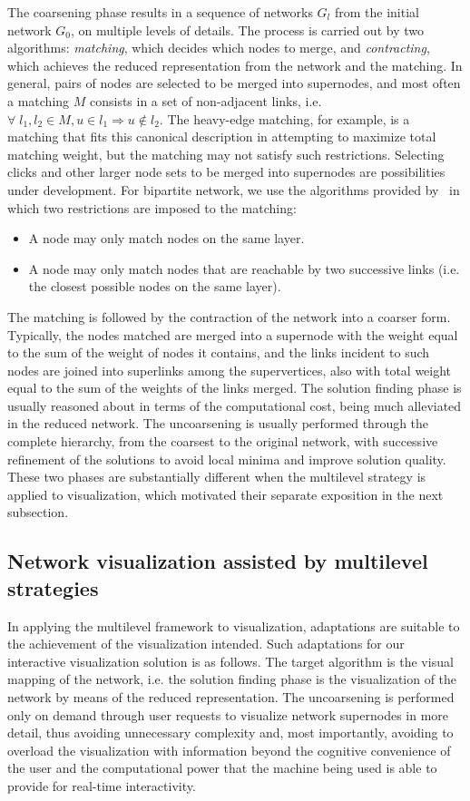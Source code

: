 \documentclass[runningheads]{llncs}
\begin{document}
The coarsening phase results in a sequence of networks $G_l$ from the initial network $G_0$,
on multiple levels of details.
The process is carried out by two algorithms: \emph{matching}, which decides which nodes to merge,
and \emph{contracting}, which achieves the reduced representation from the network and the matching.
In general, pairs of nodes are selected to be merged into supernodes, and
most often a matching $M$ consists in a set of non-adjacent links,
i.e. $\forall\; l_1, l_2 \in M, u \in l_1 \Rightarrow u \notin l_2$.
The heavy-edge matching, for example, is a matching that fits this canonical description
in attempting to maximize total matching weight, but the matching may not satisfy such restrictions.
Selecting clicks and other larger node sets to be merged into supernodes are possibilities
under development.
For bipartite network, we use the algorithms provided by~\cite{alan2} in which two restrictions
are imposed to the matching:
\begin{itemize}
  \item A node may only match nodes on the same layer.
  \item A node may only match nodes that are reachable by two successive links
    (i.e. the closest possible nodes on the same layer).
\end{itemize}

The matching is followed by the contraction of the network into a coarser form.
Typically, the nodes matched are merged into a supernode
with the weight equal to the sum of the weight of nodes it contains,
and the links incident to such nodes are joined into superlinks among the supervertices,
also with total weight equal to the sum of the weights of the links merged.
The solution finding phase is usually reasoned about in terms of the computational cost, being much
alleviated in the reduced network.
The uncoarsening is usually performed through the complete hierarchy,
from the coarsest to the original network, with successive refinement of the solutions to
avoid local minima and improve solution quality.
These two phases are substantially different when the multilevel strategy is applied to visualization,
which motivated their separate exposition in the next subsection.

\subsection{Network visualization assisted by multilevel strategies}\label{net}
In applying the multilevel framework to visualization, adaptations are suitable to
the achievement of the visualization intended.
Such adaptations for our interactive visualization solution is as follows.
The target algorithm is the visual mapping of the network,
i.e. the solution finding phase is the visualization of the network by means of
the reduced representation.
The uncoarsening is performed only on demand through user requests
to visualize network supernodes in more detail,
thus avoiding unnecessary complexity and,
most importantly, avoiding to overload the visualization with information beyond the
cognitive convenience of the user and the computational power that the machine being used
is able to provide for real-time interactivity.
\end{document}
